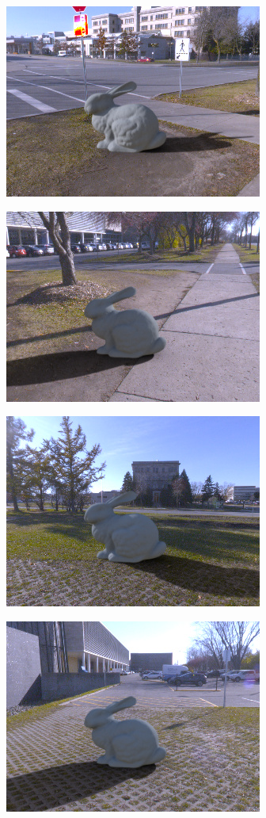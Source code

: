 \begin{minipage}{\linewidth}
\begin{multicols}{4}
\includegraphics[width=\mywidth]{AG8A2875_Panorama_hdr-corrected_009.jpg}

\includegraphics[width=\mywidth]{AG8A2875_Panorama_hdr-corrected_004.jpg}

\includegraphics[width=\mywidth]{AG8A2917_Panorama_hdr-corrected_007.jpg}

\includegraphics[width=\mywidth]{AG8A2917_Panorama_hdr-corrected_015.jpg}


\end{multicols}
\end{minipage}
